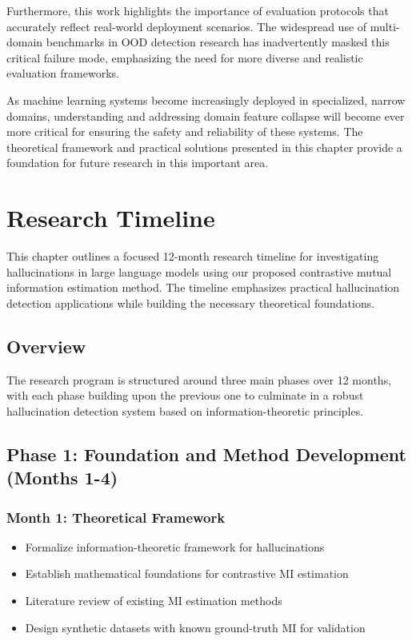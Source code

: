 \documentclass[11pt, oneside]{book}
\theoremstyle{plain}
\theoremstyle{definition}
\theoremstyle{remark}
\begin{document}
Furthermore, this work highlights the importance of evaluation protocols that accurately reflect real-world deployment scenarios. The widespread use of multi-domain benchmarks in OOD detection research has inadvertently masked this critical failure mode, emphasizing the need for more diverse and realistic evaluation frameworks.

As machine learning systems become increasingly deployed in specialized, narrow domains, understanding and addressing domain feature collapse will become ever more critical for ensuring the safety and reliability of these systems. The theoretical framework and practical solutions presented in this chapter provide a foundation for future research in this important area.





\chapter{Research Timeline}

This chapter outlines a focused 12-month research timeline for investigating hallucinations in large language models using our proposed contrastive mutual information estimation method. The timeline emphasizes practical hallucination detection applications while building the necessary theoretical foundations.

\section{Overview}

The research program is structured around three main phases over 12 months, with each phase building upon the previous one to culminate in a robust hallucination detection system based on information-theoretic principles.

\section{Phase 1: Foundation and Method Development (Months 1-4)}

\subsection{Month 1: Theoretical Framework}
\begin{itemize}
    \item Formalize information-theoretic framework for hallucinations
    \item Establish mathematical foundations for contrastive MI estimation
    \item Literature review of existing MI estimation methods
    \item Design synthetic datasets with known ground-truth MI for validation
\end{itemize}
\end{document}
